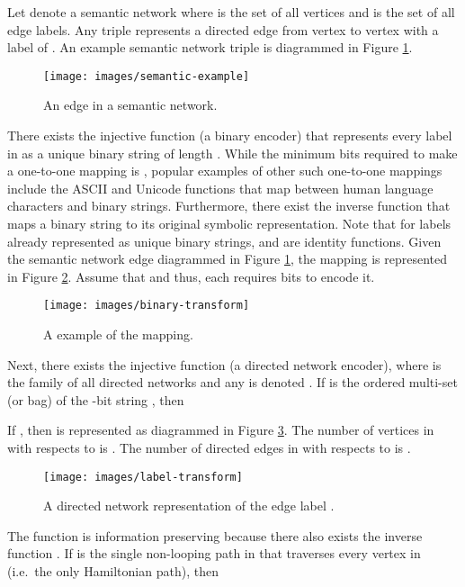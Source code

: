 \documentclass[twocolumn,preprintnumbers,amsmath,amssymb,letter]{revtex4}
\begin{document}
Let  denote a semantic network where  is the set of all vertices and  is the set of all edge labels. Any triple  represents a directed edge from vertex  to vertex  with a label of .  An example semantic network triple is diagrammed in Figure \ref{fig:semantic-example}.
\begin{figure}[h!]
	\centering
	\texttt{[image: images/semantic-example]}
	 \caption{\label{fig:semantic-example}An edge in a semantic network.}
\end{figure}

There exists the injective function  (a binary encoder) that represents every label in  as a unique binary string of length . While the minimum bits required to make a one-to-one mapping is , popular examples of other such one-to-one mappings include the ASCII and Unicode functions that map between human language characters and binary strings. Furthermore, there exist the inverse function  that maps a binary string to its original symbolic representation. Note that for labels already represented as unique binary strings,  and  are identity functions. Given the semantic network edge diagrammed in Figure \ref{fig:semantic-example}, the  mapping is represented in Figure \ref{fig:binary-transform}. Assume that  and thus, each  requires  bits to encode it.
\begin{figure}[h!]
	\centering
	\texttt{[image: images/binary-transform]}
	 \caption{\label{fig:binary-transform}A example of the  mapping.}
\end{figure}

Next, there exists the injective function  (a directed network encoder), where  is the family of all directed networks and any  is denoted . If  is the ordered multi-set (or bag) of the -bit string , then

If , then  is represented as diagrammed in Figure \ref{fig:label-transform}. The number of vertices in  with respects to  is . The number of directed edges in  with respects to  is . 
\begin{figure}[h!]
	\centering
	\texttt{[image: images/label-transform]}
	 \caption{\label{fig:label-transform}A directed network representation of the edge label .}
\end{figure}

The function  is information preserving because there also exists the inverse function . If  is the single non-looping path in  that traverses every vertex in  (i.e.~the only Hamiltonian path), then
\end{document}
